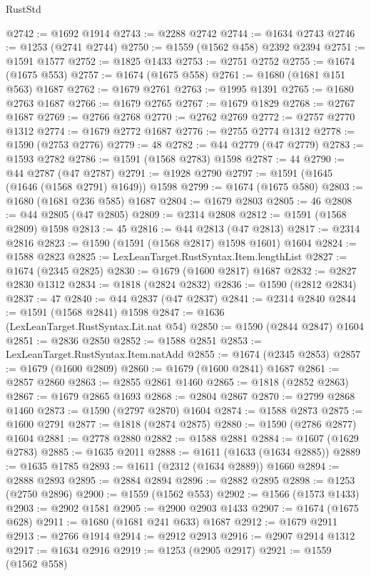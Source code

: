 \begin{lexlean}{RustStd}
\begin{coremodule}
@2742 := @1692 @1914
@2743 := @2288 @2742
@2744 := @1634 @2743
@2746 := @1253 (@2741 @2744)
@2750 := @1559 (@1562 @458) @2392 @2394
@2751 := @1591 @1577
@2752 := @1825 @1433
@2753 := @2751 @2752
@2755 := @1674 (@1675 @553)
@2757 := @1674 (@1675 @558)
@2761 := @1680 (@1681 @151 @563) @1687
@2762 := @1679 @2761
@2763 := @1995 @1391
@2765 := @1680 @2763 @1687
@2766 := @1679 @2765
@2767 := @1679 @1829
@2768 := @2767 @1687
@2769 := @2766 @2768
@2770 := @2762 @2769
@2772 := @2757 @2770 @1312
@2774 := @1679 @2772 @1687
@2776 := @2755 @2774 @1312
@2778 := @1590 (@2753 @2776)
@2779 := 48
@2782 := @44 @2779 (@47 @2779)
@2783 := @1593 @2782
@2786 := @1591 (@1568 @2783) @1598
@2787 := 44
@2790 := @44 @2787 (@47 @2787)
@2791 := @1928 @2790
@2797 := @1591 (@1645 (@1646 (@1568 @2791) @1649)) @1598
@2799 := @1674 (@1675 @580)
@2803 := @1680 (@1681 @236 @585) @1687
@2804 := @1679 @2803
@2805 := 46
@2808 := @44 @2805 (@47 @2805)
@2809 := @2314 @2808
@2812 := @1591 (@1568 @2809) @1598
@2813 := 45
@2816 := @44 @2813 (@47 @2813)
@2817 := @2314 @2816
@2823 := @1590 (@1591 (@1568 @2817) @1598 @1601) @1604
@2824 := @1588 @2823
@2825 := LexLeanTarget.RustSyntax.Item.lengthList
@2827 := @1674 (@2345 @2825)
@2830 := @1679 (@1600 @2817) @1687
@2832 := @2827 @2830 @1312
@2834 := @1818 (@2824 @2832)
@2836 := @1590 (@2812 @2834)
@2837 := 47
@2840 := @44 @2837 (@47 @2837)
@2841 := @2314 @2840
@2844 := @1591 (@1568 @2841) @1598
@2847 := @1636 (LexLeanTarget.RustSyntax.Lit.nat @54)
@2850 := @1590 (@2844 @2847) @1604
@2851 := @2836 @2850
@2852 := @1588 @2851
@2853 := LexLeanTarget.RustSyntax.Item.natAdd
@2855 := @1674 (@2345 @2853)
@2857 := @1679 (@1600 @2809)
@2860 := @1679 (@1600 @2841) @1687
@2861 := @2857 @2860
@2863 := @2855 @2861 @1460
@2865 := @1818 (@2852 @2863)
@2867 := @1679 @2865 @1693
@2868 := @2804 @2867
@2870 := @2799 @2868 @1460
@2873 := @1590 (@2797 @2870) @1604
@2874 := @1588 @2873
@2875 := @1600 @2791
@2877 := @1818 (@2874 @2875)
@2880 := @1590 (@2786 @2877) @1604
@2881 := @2778 @2880
@2882 := @1588 @2881
@2884 := @1607 (@1629 @2783)
@2885 := @1635 @2011
@2888 := @1611 (@1633 (@1634 @2885))
@2889 := @1635 @1785
@2893 := @1611 (@2312 (@1634 @2889)) @1660
@2894 := @2888 @2893
@2895 := @2884 @2894
@2896 := @2882 @2895
@2898 := @1253 (@2750 @2896)
@2900 := @1559 (@1562 @553)
@2902 := @1566 (@1573 @1433)
@2903 := @2902 @1581
@2905 := @2900 @2903 @1433
@2907 := @1674 (@1675 @628)
@2911 := @1680 (@1681 @241 @633) @1687
@2912 := @1679 @2911
@2913 := @2766 @1914
@2914 := @2912 @2913
@2916 := @2907 @2914 @1312
@2917 := @1634 @2916
@2919 := @1253 (@2905 @2917)
@2921 := @1559 (@1562 @558)

\end{coremodule}
\end{lexlean}
